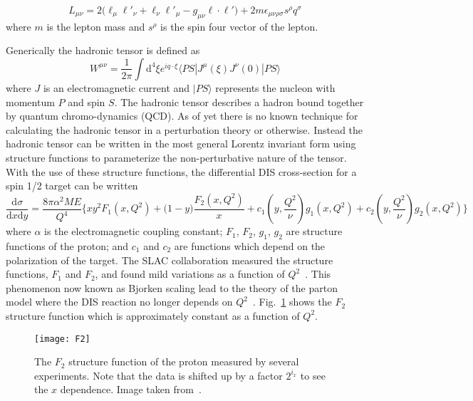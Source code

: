 \begin{equation}
  L_{\mu\nu} = 2\Big(\ell_{\mu}\ell'_{\nu} + \ell_{\nu}\ell'_{\mu} -
  g_{\mu\nu}\ell \cdot \ell' \Big) +
  2m\epsilon_{\mu\nu\rho\sigma}s^{\rho}q^{\sigma}
\end{equation}
\noindent
where $m$ is the lepton mass and $s^{\rho}$ is the spin four vector of the
lepton.

Generically the hadronic tensor is defined as
\begin{equation}
  W^{\mu\nu} = \frac{1}{2\pi}
  \int \mathrm{d}^4\xi e^{iq \cdot \xi}
  \langle PS | J^{\mu}(\xi)J^{\nu}(0) | PS \rangle
\end{equation}
\noindent
where $J$ is an electromagnetic current and $|PS \rangle$ represents the nucleon
with momentum $P$ and spin $S$.  The hadronic tensor describes a hadron bound
together by quantum chromo-dynamics (QCD).  As of yet there is no known
technique for calculating the hadronic tensor in a perturbation theory or
otherwise.  Instead the hadronic tensor can be written in the most general
Lorentz invariant form using structure functions to parameterize the
non-perturbative nature of the tensor.  With the use of these structure
functions, the differential DIS cross-section for a spin 1/2 target can be
written
\begin{equation}
  \label{equ::DIS_diffxsection}
  \frac{\mathrm{d}\sigma}{\mathrm{d}x\mathrm{d}y} =
  \frac{8\pi\alpha^2ME}{Q^4}
  \Big\{
  xy^2F_1(x, Q^2) + \Big(1-y\Big)\frac{F_2(x, Q^2)}{x}
  + c_1(y, \frac{Q^2}{\nu}) g_1(x, Q^2) + c_2(y, \frac{Q^2}{\nu}) g_2(x, Q^2)
  \Big \}
\end{equation}
\noindent
where $\alpha$ is the electromagnetic coupling constant; $F_1$, $F_2$, $g_1$,
$g_2$ are structure functions of the proton; and $c_1$ and $c_2$ are functions
which depend on the polarization of the target.  The SLAC collaboration measured
the structure functions, $F_1$ and $F_2$, and found mild variations as a
function of $Q^2$~\cite{Bloom:1969kc,Breidenbach:1969kd}.  This phenomenon now
known as Bjorken scaling lead to the theory of the parton model where the DIS
reaction no longer depends on $Q^2$~\cite{Bjorken:1969ja}.  Fig.~\ref{fig::F2}
shows the $F_2$ structure function which is approximately constant as a function
of $Q^2$.

\begin{figure}[h!t]
  \centering
  \texttt{[image: F2]}
  \caption{The $F_2$ structure function of the proton measured by several
    experiments.  Note that the data is shifted up by a factor $2^{i_x}$ to see
    the $x$ dependence.  Image taken from~\cite{Tanabashi:2018oca}.}
  \label{fig::F2}
\end{figure}



